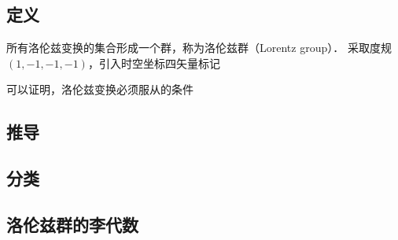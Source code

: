 \subsection{定义}
所有洛伦兹变换的集合形成一个群，称为洛伦兹群（Lorentz group）．
采取度规$(1,-1,-1,-1)$，引入时空坐标四矢量标记

可以证明，洛伦兹变换必须服从的条件

\subsection{推导}

\subsection{分类}



\subsection{洛伦兹群的李代数}